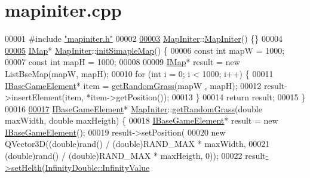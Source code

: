 \hypertarget{a00095_source}{}\section{mapiniter.\+cpp}
\label{a00095_source}

\begin{DoxyCode}
00001 \textcolor{preprocessor}{#}\textcolor{preprocessor}{include} \hyperlink{a00098}{"mapiniter.h"}
00002 
\hyperlink{a00217_a1137dec968988621ea18091fdf379987}{00003} \hyperlink{a00217}{MapIniter}::\hyperlink{a00217_a1137dec968988621ea18091fdf379987}{MapIniter}() \{\}
00004 
\hyperlink{a00217_ae6dfbed9cc8569db78442c0bfe57e252}{00005} \hyperlink{a00165}{IMap}* \hyperlink{a00217}{MapIniter}::\hyperlink{a00217_ae6dfbed9cc8569db78442c0bfe57e252}{initSimapleMap}() \{
00006   \textcolor{keyword}{const} \textcolor{keywordtype}{int} mapW = 1000;
00007   \textcolor{keyword}{const} \textcolor{keywordtype}{int} mapH = 1000;
00008 
00009   \hyperlink{a00165}{IMap}* result = \textcolor{keyword}{new} ListBseMap(mapW, mapH);
00010   \textcolor{keywordflow}{for} (\textcolor{keywordtype}{int} i = 0; i < 1000; i++) \{
00011     \hyperlink{a00137_ae2be75da1a2a9edfabe993770e24654a}{IBaseGameElement}* item = \hyperlink{a00217_a8961b80aa1df5f628bd4e28e66a51d0b}{getRandomGrass}\hyperlink{a00217_a8961b80aa1df5f628bd4e28e66a51d0b}{(}mapW
      \hyperlink{a00217_a8961b80aa1df5f628bd4e28e66a51d0b}{,} mapH\hyperlink{a00217_a8961b80aa1df5f628bd4e28e66a51d0b}{)};
00012     result->insertElement(item, *item->getPosition());
00013   \}
00014   \textcolor{keywordflow}{return} result;
00015 \}
00016 
\hyperlink{a00217_a8961b80aa1df5f628bd4e28e66a51d0b}{00017} \hyperlink{a00137_ae2be75da1a2a9edfabe993770e24654a}{IBaseGameElement}* \hyperlink{a00217}{MapIniter}::\hyperlink{a00217_a8961b80aa1df5f628bd4e28e66a51d0b}{getRandomGrass}(\textcolor{keywordtype}{double} 
      maxWidth, \textcolor{keywordtype}{double} maxHeigth) \{
00018   \hyperlink{a00137_ae2be75da1a2a9edfabe993770e24654a}{IBaseGameElement}* result = \textcolor{keyword}{new} \hyperlink{a00137_ae2be75da1a2a9edfabe993770e24654a}{IBaseGameElement}();
00019   result->setPosition(
00020       \textcolor{keyword}{new} QVector3D((\textcolor{keywordtype}{double})rand() / (\textcolor{keywordtype}{double})RAND\_MAX * maxWidth,
00021                     (\textcolor{keywordtype}{double})rand() / (\textcolor{keywordtype}{double})RAND\_MAX * maxHeigth, 0));
00022   result\hyperlink{a00137_a2f95e7a61b5db7f2fbbfd32ff786f58c}{->}\hyperlink{a00137_a2f95e7a61b5db7f2fbbfd32ff786f58c}{setHelth}\hyperlink{a00137_a2f95e7a61b5db7f2fbbfd32ff786f58c}{(}\hyperlink{a00161_a8d33637f68b523cf2b21abd1509c47bf}{InfinityDouble}\hyperlink{a00161_a67fae871f96708313bedc644630ac8bc}{::}\hyperlink{a00161_a67fae871f96708313bedc644630ac8bc}{InfinityValue}

\end{DoxyCode}
